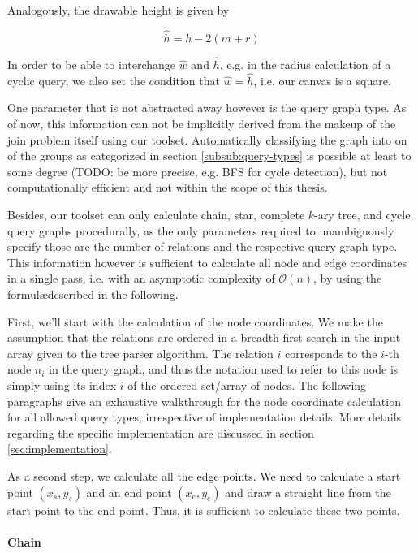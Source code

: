 Analogously, the drawable height is given by

\begin{equation}\label{eqn:painting-h_hat}
    \hat{h} = h - 2(m + r)    
\end{equation}

In order to be able to interchange $\hat{w}$ and $\hat{h}$, e.g. in the radius calculation of a cyclic query, we also set the condition that $\hat{w} = \hat{h}$, i.e. our canvas is a square.

One parameter that is not abstracted away however is the query graph type. As of now, this information can not be implicitly derived from the makeup of the join problem itself using our toolset. Automatically classifying the graph into on of the groups as categorized in section \ref{subsub:query-types} is possible at least to some degree (TODO: be more precise, e.g. BFS for cycle detection), but not computationally efficient and not within the scope of this thesis.

Besides, our toolset can only calculate chain, star, complete $k$-ary tree, and cycle query graphs procedurally, as the only parameters required to unambiguously specify those are the number of relations and the respective query graph type. This information however is sufficient to calculate all node and edge coordinates in a single pass, i.e. with an asymptotic complexity of $\mathcal{O}(n)$, by using the formul\ae described in the following.


First, we'll start with the calculation of the node coordinates. We make the assumption that the relations are ordered in a breadth-first search in the input array given to the tree parser algorithm. The relation $i$ corresponds to the $i$-th node $n_i$ in the query graph, and thus the notation used to refer to this node is simply using its index $i$ of the ordered set/array of nodes. The following paragraphs give an exhaustive walkthrough for the node coordinate calculation for all allowed query types, irrespective of implementation details. More details regarding the specific implementation are discussed in section \ref{sec:implementation}.

As a second step, we calculate all the edge points. We need to calculate a start point $(x_s, y_s)$ and an end point $(x_e, y_e)$ and draw a straight line from the start point to the end point. Thus, it is sufficient to calculate these two points.

\paragraph{Chain} 

